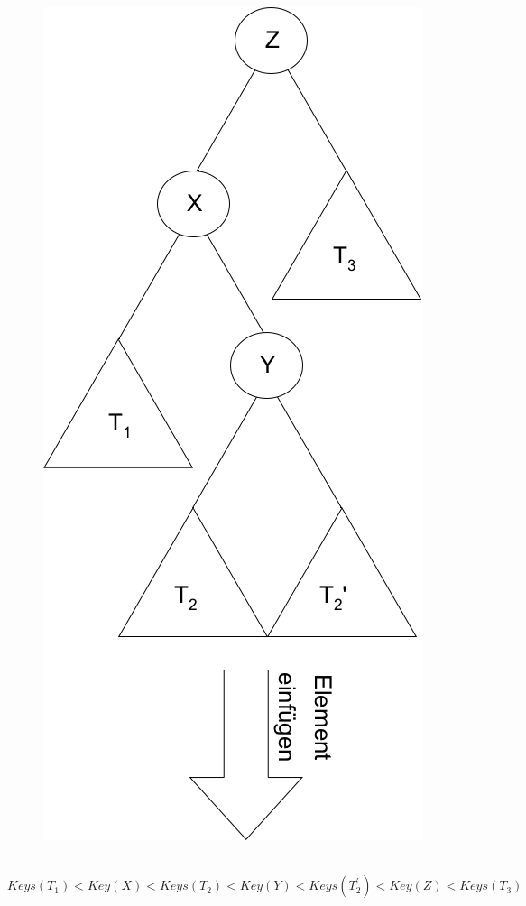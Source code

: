 \begin{minipage}[t]{0.2\textwidth}
\begin{figure}[H]
\includegraphics[width=\textwidth,left]{11/Grafik/img4_doppelRotation_1.png}\\
\end{figure}
\end{minipage}%
%
\begin{minipage}[t]{0.75\textwidth}
\hspace{5mm}\\


$Keys(T_1) < Key(X) < Keys(T_2) < Key(Y) < Keys(T_2^{'}) < Key(Z) < Keys(T_3)$
\end{minipage}


